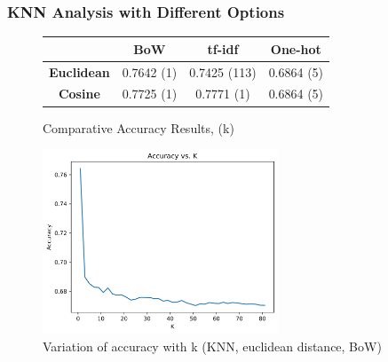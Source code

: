 \documentclass{beamer}
\begin{document}
\begin{frame}
\frametitle{KNN Analysis with Different Options}

\begin{figure}[h]
  \centering
  \begin{tabular}{|c|c|c|c|}
  \hline
  & \textbf{BoW} & \textbf{tf-idf} & \textbf{One-hot} \\ \hline
  \textbf{Euclidean} & 0.7642 (1) & 0.7425 (113) & 0.6864 (5) \\ \hline
  \textbf{Cosine} &  0.7725 (1) & 0.7771 (1) & 0.6864 (5) \\ \hline
  \end{tabular}
  \caption{Comparative Accuracy Results, (k)}
  \label{tab:accuracy}
\end{figure}

\vspace{-0.5cm} %

\begin{figure}[h]
  \centering
  \includegraphics[width=7cm]{accuracy_plot.png}
  \vspace{-0.2cm} %
  \caption{Variation of accuracy with k (KNN, euclidean distance, BoW)}
  \label{fig:KNNOptions}
\end{figure}

\end{frame}
\end{document}
